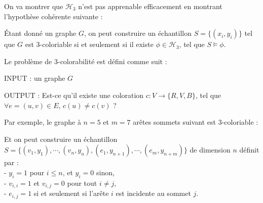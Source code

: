 \documentclass{article}
\theoremstyle{plain}
\theoremstyle{remark}
\theoremstyle{definition}
\begin{document}
On va montrer que $\mathcal{H}_3$ n'est pas apprenable efficacement en montrant l'hypothèse cohérente suivante :

\'Etant donné un graphe $G$, on peut construire un échantillon $S=\{(x_i,y_i)\}$ tel que $G$ est 3-coloriable si et seulement si il existe $\phi\in\mathcal{H}_3$, tel que $S\models\phi$.

Le problème de 3-colorabilité est défini comme suit :

INPUT : un graphe $G$

OUTPUT : Est-ce qu'il existe une coloration $c : V \rightarrow \{R,V,B\}$, tel que $\forall e=(u,v)\in E$, $c(u)\neq c(v)$ ?

Par exemple, le graphe à $n=5$ et $m=7$ arêtes sommets suivant est 3-coloriable :

\begin{figure}[!h]
\centering
{}
\end{figure}

Et on peut construire un échantillon\\
$S=\{(v_1,y_1),\cdots,(v_n,y_n),(e_1,y_{n+1}),\cdots,(e_m,y_{n+m})\}$ de dimension $n$ définit par :\\
- $y_i=1$ pour $i\leq n$, et $y_i=0$ sinon,\\
- $v_{i,i}=1$ et $v_{i,j}=0$ pour tout $i\neq j$,\\
- $e_{i,j}=1$ si et seulement si l'arête $i$ est incidente au sommet $j$.
\end{document}
